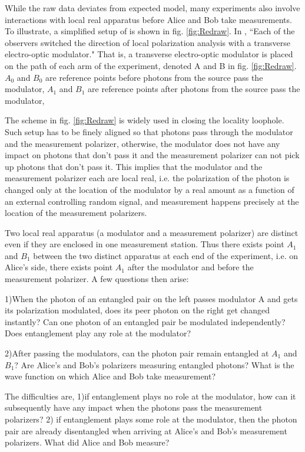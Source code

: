 \documentclass[prd,showpacs,twocolumn]{revtex4-1}
\begin{document}
While the raw data deviates from expected model, many experiments also involve interactions with local real apparatus before Alice and Bob take measurements. To illustrate, a simplified setup of \cite{Weihs} is shown in fig. \ref{fig:Redraw}. In \cite{Weihs}, ``Each of the observers switched the direction of local polarization analysis with a transverse electro-optic modulator." That is, a transverse electro-optic modulator is placed on the path of each arm of the experiment, denoted A and B in fig. \ref{fig:Redraw}. $A_0$ and $B_0$ are reference points before photons from the source pass the modulator, $A_1$ and $B_1$ are reference points after photons from the source pass the modulator,

The scheme in fig. \ref{fig:Redraw} is widely used in closing the locality loophole. Such setup has to be finely aligned so that photons pass through the modulator and the measurement polarizer, otherwise, the modulator does not have any impact on photons that don't pass it and the measurement polarizer can not pick up photons that don't pass it. This implies that the modulator and the measurement polarizer each are local real, i.e. the polarization of the photon is changed only at the location of the modulator by a real amount as a function of an external controlling random signal, and measurement happens precisely at the location of the measurement polarizers.

Two local real apparatus (a modulator and a measurement polarizer) are distinct even if they are enclosed in one measurement station. Thus there exists point $A_1$ and $B_1$ between the two distinct apparatus at each end of the experiment, i.e. on Alice's side, there exists point $A_1$ after the modulator and before the measurement polarizer. A few questions then arise:

1)When the photon of an entangled pair on the left passes modulator A and gets its polarization modulated, does its peer photon on the right get changed instantly? Can one photon of an entangled pair be modulated independently? Does entanglement play any role at the modulator?

2)After passing the modulators, can the photon pair remain entangled at $A_1$ and $B_1$? Are Alice's and Bob's polarizers measuring entangled photons? What is the wave function on which Alice and Bob take measurement?

The difficulties are, 1)if entanglement plays no role at the modulator, how can it subsequently have any impact when the photons pass the measurement polarizers? 2) if entanglement plays some role at the modulator, then the photon pair are already disentangled when arriving at Alice's and Bob's measurement polarizers. What did Alice and Bob measure?
\end{document}
